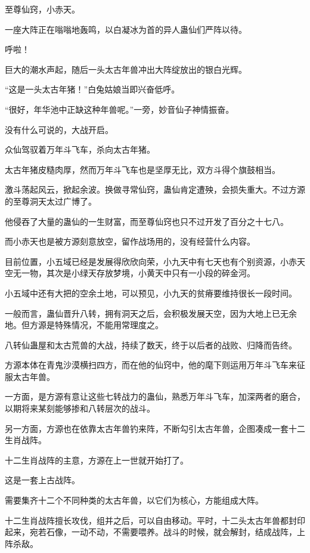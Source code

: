 
\begin{this_body}

至尊仙窍，小赤天。

一座大阵正在嗡嗡地轰鸣，以白凝冰为首的异人蛊仙们严阵以待。

呼啦！

巨大的潮水声起，随后一头太古年兽冲出大阵绽放出的银白光辉。

“这是一头太古年猪！”白兔姑娘当即兴奋低呼。

“很好，年华池中正缺这种年兽呢。”一旁，妙音仙子神情振奋。

没有什么可说的，大战开启。

众仙驾驭着万年斗飞车，杀向太古年猪。

太古年猪皮糙肉厚，然而万年斗飞车也是坚厚无比，双方斗得个旗鼓相当。

激斗荡起风云，掀起余波。换做寻常仙窍，蛊仙肯定遭殃，会损失重大。不过方源的至尊洞天太过广博了。

他侵吞了大量的蛊仙的一生财富，而至尊仙窍也只不过开发了百分之十七八。

而小赤天也是被方源刻意放空，留作战场用的，没有经营什么内容。

目前位置，小五域已经是发展得欣欣向荣，小九天中有七天也有个别资源，小赤天空无一物，其次是小绿天存放梦境，小黄天中只有一小段的碎金河。

小五域中还有大把的空余土地，可以预见，小九天的贫瘠要维持很长一段时间。

一般而言，蛊仙晋升八转，拥有洞天之后，会积极发展天空，因为大地上已无余地。但方源是特殊情况，不能用常理度之。

八转仙蛊屋和太古荒兽的大战，持续了数天，终于以后者的战败、归降而告终。

方源本体在青鬼沙漠横扫四方，而在他的仙窍中，他的麾下则运用万年斗飞车来征服太古年兽。

一方面，是方源有意让这些七转战力的蛊仙，熟悉万年斗飞车，加深两者的磨合，以期将来某刻能够掺和八转层次的战斗。

另一方面，方源也在依靠太古年兽钓来阵，不断勾引太古年兽，企图凑成一套十二生肖战阵。

十二生肖战阵的主意，方源在上一世就开始打了。

这是一套上古战阵。

需要集齐十二个不同种类的太古年兽，以它们为核心，方能组成大阵。

十二生肖战阵擅长攻伐，组并之后，可以自由移动。平时，十二头太古年兽都封印起来，宛若石像，一动不动，不需要喂养。战斗的时候，就会解封，结成战阵，上阵杀敌。


\end{this_body}
